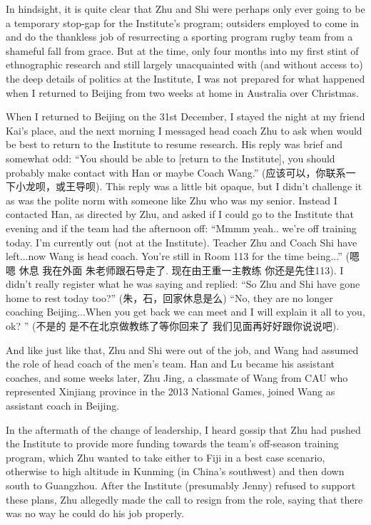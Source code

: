   In hindsight, it is quite clear that Zhu and Shi were perhaps only ever going to be a temporary stop-gap for the Institute's program; outsiders employed to come in and do the thankless job of resurrecting a sporting program rugby team from a shameful fall from grace.  But at the time, only four months into my first stint of ethnographic research and still largely unacquainted with (and without access to) the deep details of politics at the Institute, I was not prepared for what happened when I returned to Beijing from two weeks at home in Australia over Christmas.

  When I returned to Beijing on the 31st December, I stayed the night at my friend Kai's place, and the next morning I messaged head coach Zhu to ask when would be best to return to the Institute to resume research.  His reply was brief and somewhat odd: ``You should be able to [return to the Institute], you should probably make contact with Han or maybe Coach Wang.'' (应该可以，你联系一下小龙呗，或王导呗).  This reply was a little bit opaque, but I didn't challenge it as was the polite norm with someone like Zhu who was my senior.  Instead I contacted Han, as directed by Zhu, and asked if I could go to the Institute that evening and if the team had the afternoon off: ``Mmmm yeah.. we're off training today. I'm currently out (not at the Institute). Teacher Zhu and Coach Shi have left...now Wang is head coach.  You're still in Room 113 for the time being...'' (嗯嗯 休息 我在外面 朱老师跟石导走了. 现在由王重一主教练 你还是先住113).  I didn't really register what he was saying and replied:
  ``So Zhu and Shi have gone home to rest today too?'' (朱，石，回家休息是么)
  ``No, they are no longer coaching Beijing...When you get back we can meet and I will explain it all to you, ok? '' (不是的 是不在北京做教练了等你回来了 我们见面再好好跟你说说吧).

  And like just like that, Zhu and Shi were out of the job, and Wang had assumed the role of head coach of the men's team.  Han and Lu became his assistant coaches, and some weeks later, Zhu Jing, a classmate of Wang from CAU who represented Xinjiang province in the 2013 National Games, joined Wang as assistant coach in Beijing.

  In the aftermath of the change of leadership, I heard gossip that Zhu had pushed the Institute to provide more funding towards the team's off-season training program, which Zhu wanted to take either to Fiji in a best case scenario, otherwise to high altitude in Kunming (in China's southwest) and then down south to Guangzhou. After the Institute (presumably Jenny) refused to support these plans, Zhu allegedly made the call to resign from the role, saying that there was no way he could do his job properly.

